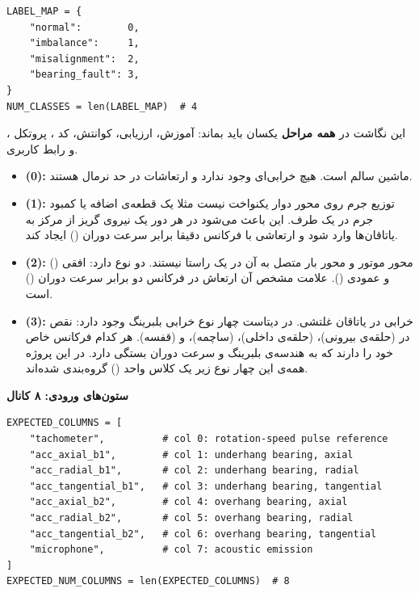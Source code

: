 \documentclass{article}
\newcommand{\pmdash}{\lr{---}}
\newcommand{\mysubsection}[1]{
\par\vspace{0.5cm}
\noindent\textcolor{main_blue}{\large\textbf{#1}}
\par\vspace{0.2cm}
}
\begin{document}
\begin{latin}
\begin{lstlisting}
LABEL_MAP = {
    "normal":        0,
    "imbalance":     1,
    "misalignment":  2,
    "bearing_fault": 3,
}
NUM_CLASSES = len(LABEL_MAP)  # 4
\end{lstlisting}
\end{latin}

این نگاشت در \textbf{همه مراحل} یکسان باید بماند: آموزش، ارزیابی، کوانتش، کد ، پروتکل ، و رابط کاربری.

\begin{itemize}
\item {} \textbf{(0):} ماشین سالم است. هیچ خرابی‌ای وجود ندارد و ارتعاشات در حد نرمال هستند.

\item {} \textbf{(1):} توزیع جرم روی محور دوار یکنواخت نیست \pmdash{} مثلا یک قطعه‌ی اضافه
یا کمبود جرم در یک طرف. این باعث می‌شود در هر دور یک نیروی گریز از مرکز به یاتاقان‌ها وارد شود
و ارتعاشی با فرکانس دقیقا برابر سرعت دوران () ایجاد کند.

\item {} \textbf{(2):} محور موتور و محور بار متصل به آن در یک راستا نیستند.
دو نوع دارد: افقی () و عمودی ().
علامت مشخص آن ارتعاش در فرکانس دو برابر سرعت دوران () است.

\item {} \textbf{(3):} خرابی در یاتاقان غلتشی. در دیتاست 
چهار نوع خرابی بلبرینگ وجود دارد: نقص در  (حلقه‌ی بیرونی)،
 (حلقه‌ی داخلی)،  (ساچمه)، و  (قفسه).
هر کدام فرکانس خاص خود را دارند که به هندسه‌ی بلبرینگ و سرعت دوران بستگی دارد.
در این پروژه همه‌ی این چهار نوع زیر یک کلاس واحد () گروه‌بندی شده‌اند.
\end{itemize}

\mysubsection{ستون‌های ورودی: ۸ کانال }

\begin{latin}
\begin{lstlisting}
EXPECTED_COLUMNS = [
    "tachometer",          # col 0: rotation-speed pulse reference
    "acc_axial_b1",        # col 1: underhang bearing, axial
    "acc_radial_b1",       # col 2: underhang bearing, radial
    "acc_tangential_b1",   # col 3: underhang bearing, tangential
    "acc_axial_b2",        # col 4: overhang bearing, axial
    "acc_radial_b2",       # col 5: overhang bearing, radial
    "acc_tangential_b2",   # col 6: overhang bearing, tangential
    "microphone",          # col 7: acoustic emission
]
EXPECTED_NUM_COLUMNS = len(EXPECTED_COLUMNS)  # 8
\end{lstlisting}
\end{latin}
\end{document}
